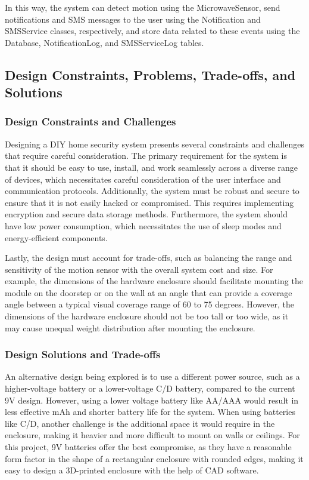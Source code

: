 \documentclass[conference]{IEEEtran}
\begin{document}
In this way, the system can detect motion using the MicrowaveSensor, send notifications
and SMS messages to the user using the Notification and SMSService classes, respectively,
and store data related to these events using the Database, NotificationLog, and
SMSServiceLog tables.

\subsection{Design Constraints, Problems, Trade-offs, and Solutions}

\subsubsection{Design Constraints and Challenges}

Designing a DIY home security system presents several constraints and challenges that
require careful consideration. The primary requirement for the system is that it should
be easy to use, install, and work seamlessly across a diverse range of devices, which
necessitates careful consideration of the user interface and communication protocols.
Additionally, the system must be robust and secure to ensure that it is not easily
hacked or compromised. This requires implementing encryption and secure data storage
methods. Furthermore, the system should have low power consumption, which necessitates
the use of sleep modes and energy-efficient components.

Lastly, the design must account for trade-offs, such as balancing the range and
sensitivity of the motion sensor with the overall system cost and size. For example,
the dimensions of the hardware enclosure should facilitate mounting the module on the
doorstep or on the wall at an angle that can provide a coverage angle between a
typical visual coverage range of 60 to 75 degrees. However, the dimensions of the
hardware enclosure should not be too tall or too wide, as it may cause unequal weight
distribution after mounting the enclosure.

\subsubsection{Design Solutions and Trade-offs}

An alternative design being explored is to use a different power source,
such as a higher-voltage battery or a lower-voltage C/D battery, compared to the
current 9V design. However, using a lower voltage battery like AA/AAA would result
in less effective mAh and shorter battery life for the system. When using batteries
like C/D, another challenge is the additional space it would require in the enclosure,
making it heavier and more difficult to mount on walls or ceilings. For this project,
9V batteries offer the best compromise, as they have a reasonable form factor in the
shape of a rectangular enclosure with rounded edges, making it easy to design a
3D-printed enclosure with the help of CAD software.
\end{document}
